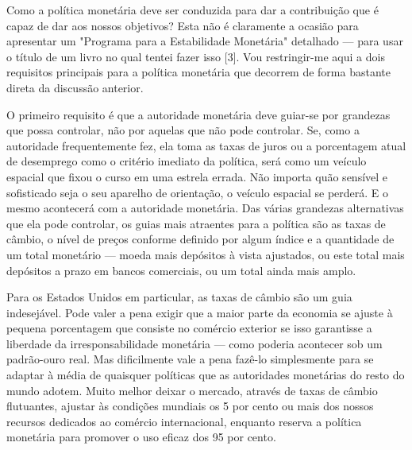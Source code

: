 \documentclass[12pt]{article}
\begin{document}
Como a política monetária deve ser conduzida para dar a contribuição que é capaz de dar aos nossos objetivos? Esta não é claramente a ocasião para apresentar um "Programa para a Estabilidade Monetária" detalhado — para usar o título de um livro no qual tentei fazer isso [3]. Vou restringir-me aqui a dois requisitos principais para a política monetária que decorrem de forma bastante direta da discussão anterior.

O primeiro requisito é que a autoridade monetária deve guiar-se por grandezas que possa controlar, não por aquelas que não pode controlar. Se, como a autoridade frequentemente fez, ela toma as taxas de juros ou a porcentagem atual de desemprego como o critério imediato da política, será como um veículo espacial que fixou o curso em uma estrela errada. Não importa quão sensível e sofisticado seja o seu aparelho de orientação, o veículo espacial se perderá. E o mesmo acontecerá com a autoridade monetária. Das várias grandezas alternativas que ela pode controlar, os guias mais atraentes para a política são as taxas de câmbio, o nível de preços conforme definido por algum índice e a quantidade de um total monetário — moeda mais depósitos à vista ajustados, ou este total mais depósitos a prazo em bancos comerciais, ou um total ainda mais amplo.

Para os Estados Unidos em particular, as taxas de câmbio são um guia indesejável. Pode valer a pena exigir que a maior parte da economia se ajuste à pequena porcentagem que consiste no comércio exterior se isso garantisse a liberdade da irresponsabilidade monetária — como poderia acontecer sob um padrão-ouro real. Mas dificilmente vale a pena fazê-lo simplesmente para se adaptar à média de quaisquer políticas que as autoridades monetárias do resto do mundo adotem. Muito melhor deixar o mercado, através de taxas de câmbio flutuantes, ajustar às condições mundiais os 5 por cento ou mais dos nossos recursos dedicados ao comércio internacional, enquanto reserva a política monetária para promover o uso eficaz dos 95 por cento.
\end{document}
